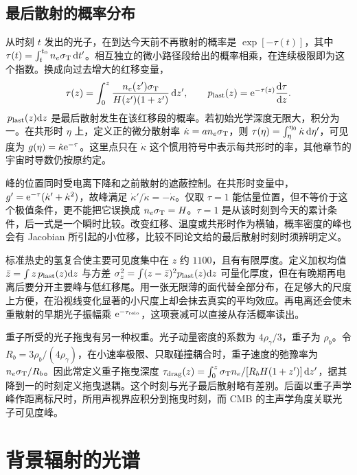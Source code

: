 \subsection{最后散射的概率分布}

从时刻 $t$ 发出的光子，在到达今天前不再散射的概率是 $\exp[-\tau(t)]$，其中 $\tau(t)=\int_t^{t_0}n_e\sigma_{\rm T}\,\dd t'$。相互独立的微小路径段给出的概率相乘，在连续极限即为这个指数。换成向过去增大的红移变量，
\begin{equation}\label{eq:cosmo-background-opacity}
 \tau(z)=\int_0^z\frac{n_e(z')\sigma_{\rm T}}{H(z')(1+z')}\,\dd z',
 \qquad p_{\rm last}(z)=\mathrm{e}^{-\tau(z)}\frac{\dd\tau}{\dd z}.
\end{equation}
$\,p_{\rm last}(z)\dd z$ 是最后散射发生在该红移段的概率。若初始光学深度无限大，积分为一。在共形时 $\eta$ 上，定义正的微分散射率 $\dot\kappa=a n_e\sigma_{\rm T}$，则 $\tau(\eta)=\int_\eta^{\eta_0}\dot\kappa\,\dd\eta'$，可见度为 $g(\eta)=\dot\kappa\mathrm{e}^{-\tau}$。这里点只在 $\dot\kappa$ 这个惯用符号中表示每共形时的率，其他章节的宇宙时导数仍按原约定。

峰的位置同时受电离下降和之前散射的遮蔽控制。在共形时变量中，$g'=\mathrm{e}^{-\tau}(\dot\kappa'+\dot\kappa^2)$，故峰满足 $\dot\kappa'/\dot\kappa=-\dot\kappa$。仅取 $\tau=1$ 能估量位置，但不等价于这个极值条件，更不能把它误换成 $n_e\sigma_{\rm T}=H$。$\tau=1$ 是从该时刻到今天的累计条件，后一式是一个瞬时比较。改变红移、温度或共形时作为横轴，概率密度的峰也会有 Jacobian 所引起的小位移，比较不同论文给的最后散射时刻时须辨明定义。

标准热史的氢复合使主要可见度集中在 $z$ 约 $1100$，且有有限厚度。定义加权均值 $\bar z=\int z\,p_{\rm last}(z)\dd z$ 与方差 $\sigma_z^2=\int(z-\bar z)^2p_{\rm last}(z)\dd z$ 可量化厚度，但在有晚期再电离后要分开主要峰与低红移尾。用一张无限薄的面代替全部分布，在足够大的尺度上方便，在沿视线变化显著的小尺度上却会抹去真实的平均效应。再电离还会使未重散射的早期光子振幅乘 $\mathrm{e}^{-\tau_{\rm reio}}$，这项衰减可以直接从存活概率读出。

重子所受的光子拖曳有另一种权重。光子动量密度的系数为 $4\rho_\gamma/3$，重子为 $\rho_b$。令 $R_b=3\rho_b/(4\rho_\gamma)$，在小速率极限、只取碰撞耦合时，重子速度的弛豫率为 $n_e\sigma_{\rm T}/R_b$。因此常定义重子拖曳深度 $\tau_{\rm drag}(z)=\int_0^z \sigma_{\rm T}n_e/[R_bH(1+z')]\,\dd z'$，据其降到一的时刻定义拖曳退耦。这个时刻与光子最后散射略有差别。后面以重子声学峰作距离标尺时，所用声视界应积分到拖曳时刻，而 CMB 的主声学角度关联光子可见度峰。

\section{背景辐射的光谱}\label{sec:cosmo-spectrum}

